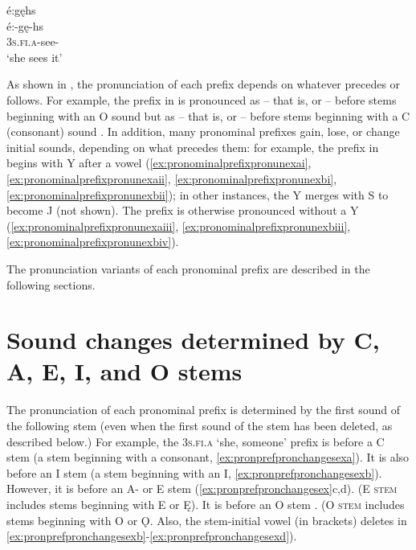 	    \ex é:gęhs \\
     \gll  é:-gę-hs \\
     \textsc{3s.fi.a}-see-{\habitual}\\ \label{ex:pronominalprefixpronunexbiv}
     \glt  ‘she sees it’ 
   
	\z
    \z
\z

As shown in , the pronunciation of each prefix depends on whatever precedes or follows. For example, the prefix in  is pronounced as  -- that is,  or  -- before stems beginning with an O sound  but as  -- that is,  or  -- before stems beginning with a C (consonant) sound . In addition, many pronominal prefixes gain, lose, or change initial sounds, depending on what precedes them: for example, the prefix in  begins with Y after a vowel (\ref{ex:pronominalprefixpronunexai}, \ref{ex:pronominalprefixpronunexaii}, \ref{ex:pronominalprefixpronunexbi}, \ref{ex:pronominalprefixpronunexbii}); in other instances, the Y merges with S to become J (not shown). The prefix is otherwise pronounced without a Y (\ref{ex:pronominalprefixpronunexaiii}, \ref{ex:pronominalprefixpronunexbiii}, \ref{ex:pronominalprefixpronunexbiv}).

The pronunciation variants of each pronominal prefix are described in the following sections.


\section{Sound changes determined by C, A, E, I, and O stems} \label{Sound changes determined by C, A, E, I, and O stems}
The  pronunciation of each pronominal prefix is determined by the first sound of the following stem (even when the first sound of the stem has been deleted, as described below.) For example, the \textsc{3s.fi.a} ‘she, someone’ prefix is  before a C stem (a stem beginning with a consonant, \ref{ex:pronprefpronchangesexa}). It is also  before an I stem (a stem beginning with an I, \ref{ex:pronprefpronchangesexb}). However, it is  before an A- or E stem (\ref{ex:pronprefpronchangesex}c,d). (\textsc{E stem} includes stems beginning with E or Ę). It is  before an O stem . (\textsc{O stem} includes stems beginning with O or Ǫ. Also, the stem-initial vowel (in brackets) deletes in \ref{ex:pronprefpronchangesexb}-\ref{ex:pronprefpronchangesexd}).

